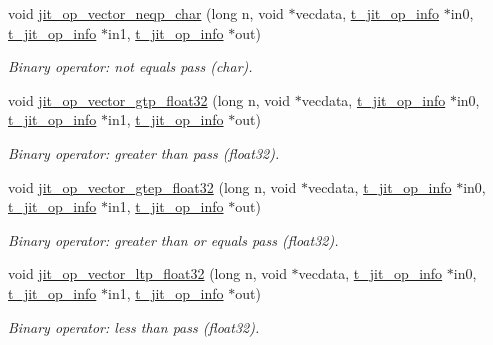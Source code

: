 \begin{DoxyCompactItemize}
void \hyperlink{group__opvecmod_ga6eef3546ccd1cc2d269725eb95ef159c}{jit\_\-op\_\-vector\_\-neqp\_\-char} (long n, void $\ast$vecdata, \hyperlink{structt__jit__op__info}{t\_\-jit\_\-op\_\-info} $\ast$in0, \hyperlink{structt__jit__op__info}{t\_\-jit\_\-op\_\-info} $\ast$in1, \hyperlink{structt__jit__op__info}{t\_\-jit\_\-op\_\-info} $\ast$out)
\begin{DoxyCompactList}\small\item\em Binary operator: not equals pass (char). \item\end{DoxyCompactList}\item 
void \hyperlink{group__opvecmod_gaf9f033b45b8029a7bc804eb164007d2d}{jit\_\-op\_\-vector\_\-gtp\_\-float32} (long n, void $\ast$vecdata, \hyperlink{structt__jit__op__info}{t\_\-jit\_\-op\_\-info} $\ast$in0, \hyperlink{structt__jit__op__info}{t\_\-jit\_\-op\_\-info} $\ast$in1, \hyperlink{structt__jit__op__info}{t\_\-jit\_\-op\_\-info} $\ast$out)
\begin{DoxyCompactList}\small\item\em Binary operator: greater than pass (float32). \item\end{DoxyCompactList}\item 
void \hyperlink{group__opvecmod_ga898b59610da31b4e3e40545673c60400}{jit\_\-op\_\-vector\_\-gtep\_\-float32} (long n, void $\ast$vecdata, \hyperlink{structt__jit__op__info}{t\_\-jit\_\-op\_\-info} $\ast$in0, \hyperlink{structt__jit__op__info}{t\_\-jit\_\-op\_\-info} $\ast$in1, \hyperlink{structt__jit__op__info}{t\_\-jit\_\-op\_\-info} $\ast$out)
\begin{DoxyCompactList}\small\item\em Binary operator: greater than or equals pass (float32). \item\end{DoxyCompactList}\item 
void \hyperlink{group__opvecmod_ga3cfd2857a5964e63449d406452e303fb}{jit\_\-op\_\-vector\_\-ltp\_\-float32} (long n, void $\ast$vecdata, \hyperlink{structt__jit__op__info}{t\_\-jit\_\-op\_\-info} $\ast$in0, \hyperlink{structt__jit__op__info}{t\_\-jit\_\-op\_\-info} $\ast$in1, \hyperlink{structt__jit__op__info}{t\_\-jit\_\-op\_\-info} $\ast$out)
\begin{DoxyCompactList}\small\item\em Binary operator: less than pass (float32). \item\end{DoxyCompactList}\item 

\end{DoxyCompactItemize}
